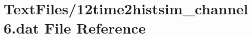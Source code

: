 \hypertarget{12time2histsim__channel6_8dat}{}\section{Text\+Files/12time2histsim\+\_\+channel6.dat File Reference}
\label{12time2histsim__channel6_8dat}
